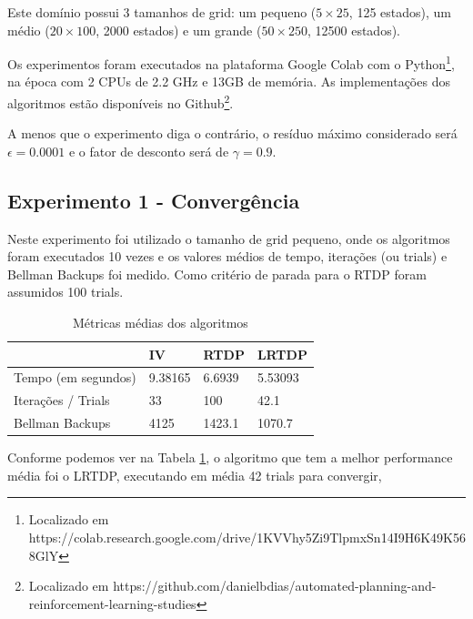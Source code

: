 \documentclass[letterpaper]{article}
\begin{document}
Este domínio possui 3 tamanhos de grid: um pequeno ($5 \times 25$, 125 estados), um médio ($20 \times 100$, 2000 estados) e um grande ($50 \times 250$, 12500 estados).

Os experimentos foram executados na plataforma Google Colab com o Python\footnote{Localizado em https://colab.research.google.com/drive/1KVVhy5Zi9TlpmxSn14I9H6K49K568GlY}, na época com 2 CPUs de 2.2 GHz e 13GB de memória. As implementações dos algoritmos estão disponíveis no Github\footnote{Localizado em https://github.com/danielbdias/automated-planning-and-reinforcement-learning-studies}.

A menos que o experimento diga o contrário, o resíduo máximo considerado será $ \epsilon = 0.0001 $ e o fator de desconto será de $\gamma = 0.9$.

\subsection{Experimento 1 - Convergência}

Neste experimento foi utilizado o tamanho de grid pequeno, onde os algoritmos foram executados 10 vezes e os valores médios de tempo, iterações (ou trials) e Bellman Backups foi medido. Como critério de parada para o RTDP foram assumidos 100 trials.

\begin{table}[ht]
    \caption{Métricas médias dos algoritmos}
    \label{table:exp1-mean-values}
    \begin{tabular}{llll}
        \toprule
        {}                  &      IV &    RTDP &    LRTDP \\
        \midrule
        Tempo (em segundos) & 9.38165 &  6.6939 &  5.53093 \\
        Iterações / Trials  &      33 &     100 &     42.1 \\
        Bellman Backups     &    4125 &  1423.1 &   1070.7 \\
        \bottomrule
    \end{tabular}
\end{table}

Conforme podemos ver na Tabela \ref{table:exp1-mean-values}, o algoritmo que tem a melhor performance média foi o LRTDP, executando em média 42 trials para convergir,
\end{document}
